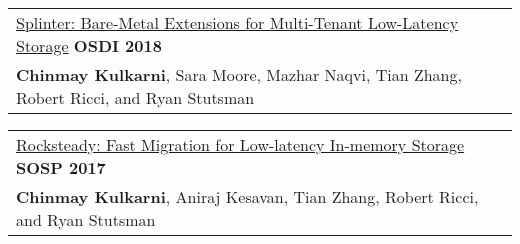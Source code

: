 \documentclass[margin,line]{res}
\begin{document}
\begin{resume}
 \vspace{-7pt}
 \begin{tabular}{@{}p{5.5in}p{4in}}
 \href{http://utah.systems/projects/kulkarni\_splinter}{Splinter:
 Bare-Metal Extensions for Multi-Tenant Low-Latency Storage} \hfill
 {\small\bf OSDI 2018}\\
 {\small{\bf Chinmay Kulkarni}, Sara Moore, Mazhar Naqvi, Tian Zhang, Robert
 Ricci, and Ryan Stutsman}\\
 \end{tabular}

 \vspace{-7pt}
 \begin{tabular}{@{}p{5.5in}p{4in}}
 \href{http://utah.systems/projects/kulkarni\_rocksteady}{Rocksteady: Fast
 Migration for Low-latency In-memory Storage} \hfill
 {\small\bf SOSP 2017}\\
 {\small{\bf Chinmay Kulkarni}, Aniraj Kesavan, Tian Zhang, Robert
 Ricci, and Ryan Stutsman}\\
 \end{tabular}






\end{resume}
\end{document}
